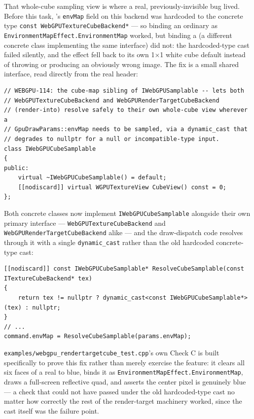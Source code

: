 That whole-cube sampling view is where a real, previously-invisible bug lived. Before this
task, 's \texttt{envMap} field on this backend was hardcoded to
the concrete type \texttt{const WebGPUTextureCubeBackend*} --- so binding an ordinary
 as \texttt{EnvironmentMapEffect.EnvironmentMap} worked, but
binding a  (a different concrete class implementing the same
 interface) did not: the hardcoded-type cast failed silently,
and the effect fell back to its own 1$\times$1 white cube default instead of throwing or
producing an obviously wrong image. The fix is a small shared interface, read directly from
the real header:

\begin{lstlisting}
// WEBGPU-114: the cube-map sibling of IWebGPUSamplable -- lets both
// WebGPUTextureCubeBackend and WebGPURenderTargetCubeBackend
// (render-into) resolve safely to their own whole-cube view wherever a
// GpuDrawParams::envMap needs to be sampled, via a dynamic_cast that
// degrades to nullptr for a null or incompatible-type input.
class IWebGPUCubeSamplable
{
public:
    virtual ~IWebGPUCubeSamplable() = default;
    [[nodiscard]] virtual WGPUTextureView CubeView() const = 0;
};
\end{lstlisting}

Both concrete classes now implement \texttt{IWebGPUCubeSamplable} alongside their own primary
interface --- \texttt{WebGPUTextureCubeBackend} and \texttt{WebGPURenderTargetCubeBackend}
alike --- and the draw-dispatch code resolves through it with a single \texttt{dynamic\_cast}
rather than the old hardcoded
concrete-type cast:

\begin{lstlisting}
[[nodiscard]] const IWebGPUCubeSamplable* ResolveCubeSamplable(const ITextureCubeBackend* tex)
{
    return tex != nullptr ? dynamic_cast<const IWebGPUCubeSamplable*>(tex) : nullptr;
}
// ...
command.envMap = ResolveCubeSamplable(params.envMap);
\end{lstlisting}

\texttt{examples/webgpu\_rendertargetcube\_test.cpp}'s own Check C is built specifically to
prove this fix rather than merely exercise the feature: it clears all six faces of a real
 to blue, binds it as \texttt{EnvironmentMapEffect.EnvironmentMap},
draws a full-screen reflective quad, and asserts the center pixel is genuinely blue --- a check
that could not have passed under the old hardcoded-type cast no matter how correctly the rest
of the render-target machinery worked, since the cast itself was the failure point.

